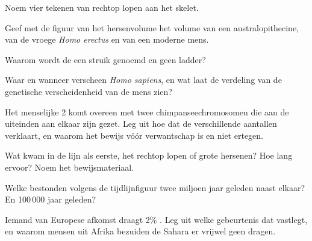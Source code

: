 \begin{exercise}[$\star$]\label{exo:g12:human-evolution:2}
Noem vier tekenen van rechtop lopen aan het skelet.
\end{exercise}

\begin{exercise}[$\star$]\label{exo:g12:human-evolution:3}
Geef met de figuur van het hersenvolume het volume van een
australopithecine, van de vroege \emph{Homo erectus} en van een moderne mens.
\end{exercise}

\begin{exercise}[$\star$]\label{exo:g12:human-evolution:4}
Waarom wordt de  een struik genoemd en geen ladder?
\end{exercise}

\begin{exercise}[$\star$]\label{exo:g12:human-evolution:5}
Waar en wanneer verscheen \emph{Homo sapiens}, en wat laat de verdeling
van de genetische verscheidenheid van de mens zien?
\end{exercise}

\begin{exercise}[$\star\star$]\label{exo:g12:human-evolution:6}
Het menselijke  2 komt overeen met twee chimpanseechromosomen
die aan de uiteinden aan elkaar zijn gezet. Leg uit hoe dat de
verschillende aantallen  verklaart, en waarom het bewijs vóór
verwantschap is en niet ertegen.
\end{exercise}

\begin{exercise}[$\star\star$]\label{exo:g12:human-evolution:7}
Wat kwam in de lijn als eerste, het rechtop lopen of grote hersenen? Hoe
lang ervoor? Noem het bewijsmateriaal.
\end{exercise}

\begin{exercise}[$\star\star$]\label{exo:g12:human-evolution:8}
Welke  bestonden volgens de tijdlijnfiguur twee miljoen jaar
geleden naast elkaar? En 100\,000 jaar geleden?
\end{exercise}

\begin{exercise}[$\star\star$]\label{exo:g12:human-evolution:9}
Iemand van Europese afkomst draagt 2\% . Leg uit welke
gebeurtenis dat vastlegt, en waarom mensen uit Afrika bezuiden de Sahara
er vrijwel geen dragen.
\end{exercise}

